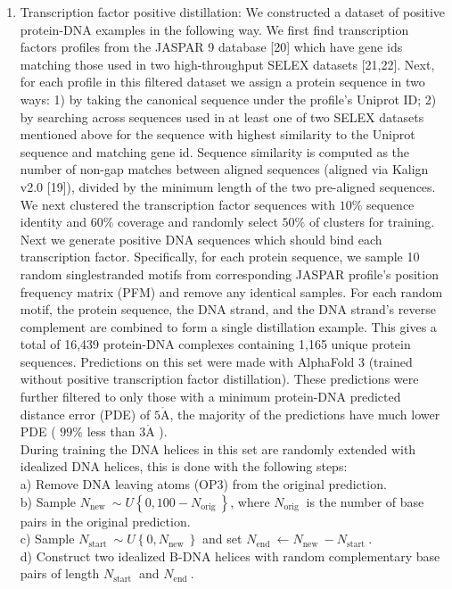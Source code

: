 \documentclass[10pt]{article}
\def\AA{\mathring{\mathrm{A}}}
\begin{document}
\begin{enumerate}
  \item Transcription factor positive distillation: We constructed a dataset of positive protein-DNA examples in the following way. We first find transcription factors profiles from the JASPAR 9 database [20] which have gene ids matching those used in two high-throughput SELEX datasets [21,22]. Next, for each profile in this filtered dataset we assign a protein sequence in two ways: 1) by taking the canonical sequence under the profile's Uniprot ID; 2) by searching across sequences used in at least one of two SELEX datasets mentioned above for the sequence with highest similarity to the Uniprot sequence and matching gene id. Sequence similarity is computed as the number of non-gap matches between aligned sequences (aligned via Kalign v2.0 [19]), divided by the minimum length of the two pre-aligned sequences. We next clustered the transcription factor sequences with $10 \%$ sequence identity and $60 \%$ coverage and randomly select $50 \%$ of clusters for training. Next we generate positive DNA sequences which should bind each transcription factor. Specifically, for each protein sequence, we sample 10 random singlestranded motifs from corresponding JASPAR profile's position frequency matrix (PFM) and remove any identical samples. For each random motif, the protein sequence, the DNA strand, and the DNA strand's reverse complement are combined to form a single distillation example. This gives a total of 16,439 protein-DNA complexes containing 1,165 unique protein sequences. Predictions on this set were made with AlphaFold 3 (trained without positive transcription factor distillation). These predictions were further filtered to only those with a minimum protein-DNA predicted distance error (PDE) of $5 \AA$, the majority of the predictions have much lower PDE ( $99 \%$ less than $3 \AA$ ).\\
During training the DNA helices in this set are randomly extended with idealized DNA helices, this is done with the following steps:\\
a) Remove DNA leaving atoms (OP3) from the original prediction.\\
b) Sample $N_{\text {new }} \sim U\left\{0,100-N_{\text {orig }}\right\}$, where $N_{\text {orig }}$ is the number of base pairs in the original prediction.\\
c) Sample $N_{\text {start }} \sim U\left\{0, N_{\text {new }}\right\}$ and set $N_{\text {end }} \leftarrow N_{\text {new }}-N_{\text {start }}$.\\
d) Construct two idealized B-DNA helices with random complementary base pairs of length $N_{\text {start }}$ and $N_{\text {end }}$.\\

\end{enumerate}
\end{document}
